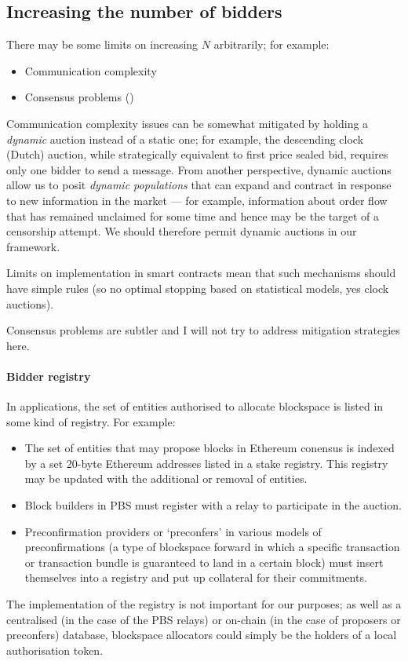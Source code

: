 \subsection{Increasing the number of bidders}

There may be some limits on increasing $N$ arbitrarily; for example:
\begin{itemize}
  \item Communication complexity
  \item Consensus problems (\cite{filecoin})
\end{itemize}
Communication complexity issues can be somewhat mitigated by holding a \emph{dynamic} auction instead of a static one; for example, the descending clock (Dutch) auction, while strategically equivalent to first price sealed bid, requires only one bidder to send a message.
%
From another perspective, dynamic auctions allow us to posit \emph{dynamic populations} that can expand and contract in response to new information in the market --- for example, information about order flow that has remained unclaimed for some time and hence may be the target of a censorship attempt.
%
We should therefore permit dynamic auctions in our framework.

Limits on implementation in smart contracts mean that such mechanisms should have simple rules (so no optimal stopping based on statistical models, yes clock auctions).

Consensus problems are subtler and I will not try to address mitigation strategies here.

\paragraph{Bidder registry}
In applications, the set of entities authorised to allocate blockspace is listed in some kind of registry.
%
For example:
\begin{itemize}
  \item 
    The set of entities that may propose blocks in Ethereum conensus is indexed by a set 20-byte Ethereum addresses listed in a stake registry. 
    This registry may be updated with the additional or removal of entities.

  \item
    Block builders in PBS must register with a relay to participate in the auction.

  \item
    Preconfirmation providers or `preconfers' in various models of preconfirmations (a type of blockspace forward in which a specific transaction or transaction bundle is guaranteed to land in a certain block) must insert themselves into a registry and put up collateral for their commitments.
\end{itemize}
%
The implementation of the registry is not important for our purposes; as well as a centralised (in the case of the PBS relays) or on-chain (in the case of proposers or preconfers) database, blockspace allocators could simply be the holders of a local authorisation token.

